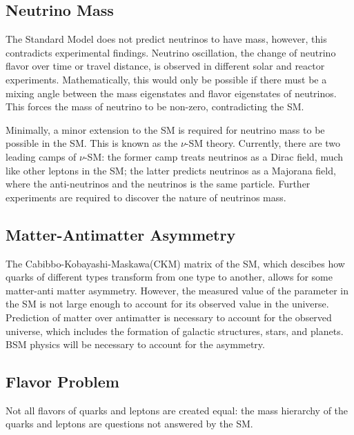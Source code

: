 {\subsection{Neutrino Mass}
The Standard Model does not predict neutrinos to have mass, however, this contradicts experimental findings. Neutrino oscillation, the change of neutrino flavor over time or travel distance, is observed in different solar and reactor experiments. Mathematically, this would only be possible if there must be a mixing angle between the mass eigenstates and flavor eigenstates of neutrinos. This forces the mass of neutrino to be non-zero, contradicting the SM.

Minimally, a minor extension to the SM is required for neutrino mass to be possible in the SM. This is known as the $\nu$-SM theory. Currently, there are two leading camps of $\nu$-SM: the former camp treats neutrinos as a Dirac field, much like other leptons in the SM; the latter predicts neutrinos as a Majorana field, where the anti-neutrinos and the neutrinos is the same particle. Further experiments are required to discover the nature of neutrinos mass. 



\subsection{Matter-Antimatter Asymmetry}
The Cabibbo-Kobayashi-Maskawa(CKM) matrix of the SM, which descibes how quarks of different types transform from one type to another, allows for some matter-anti matter asymmetry. However, the measured value of the parameter in the SM is not large enough to account for its observed value in the universe. Prediction of matter over antimatter is necessary to account for the observed universe, which includes the formation of galactic structures, stars, and planets. BSM physics will be necessary to account for the asymmetry. 

\subsection{Flavor Problem}
Not all flavors of quarks and leptons are created equal: the mass hierarchy of the quarks and leptons are questions not answered by the SM.

}
